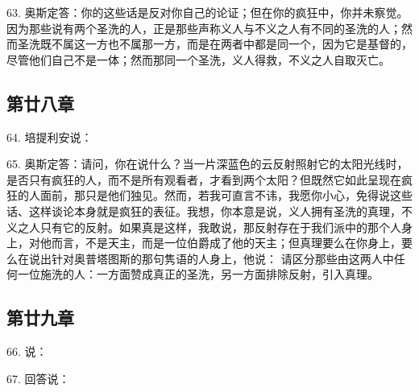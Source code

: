 63. 奥斯定答：你的这些话是反对你自己的论证；但在你的疯狂中，你并未察觉。因为那些说有两个圣洗的人，正是那些声称义人与不义之人有不同的圣洗的人；然而圣洗既不属这一方也不属那一方，而是在两者中都是同一个，因为它是基督的，尽管他们自己不是一体；然而那同一个圣洗，义人得救，不义之人自取灭亡。\par


\subsection{第廿八章}

64. 培提利安说：\par

65. 奥斯定答：请问，你在说什么？当一片深蓝色的云反射照射它的太阳光线时，是否只有疯狂的人，而不是所有观看者，才看到两个太阳？但既然它如此呈现在疯狂的人面前，那只是他们独见。然而，若我可直言不讳，我愿你小心，免得说这些话、这样谈论本身就是疯狂的表征。我想，你本意是说，义人拥有圣洗的真理，不义之人只有它的反射。如果真是这样，我敢说，那反射存在于我们派中的那个人身上，对他而言，不是天主，而是一位伯爵成了他的天主；但真理要么在你身上，要么在说出针对奥普塔图斯的那句隽语的人身上，他说： 请区分那些由这两人中任何一位施洗的人：一方面赞成真正的圣洗，另一方面排除反射，引入真理。\par


\subsection{第廿九章}

66. 说：\par

67. 回答说：\par

